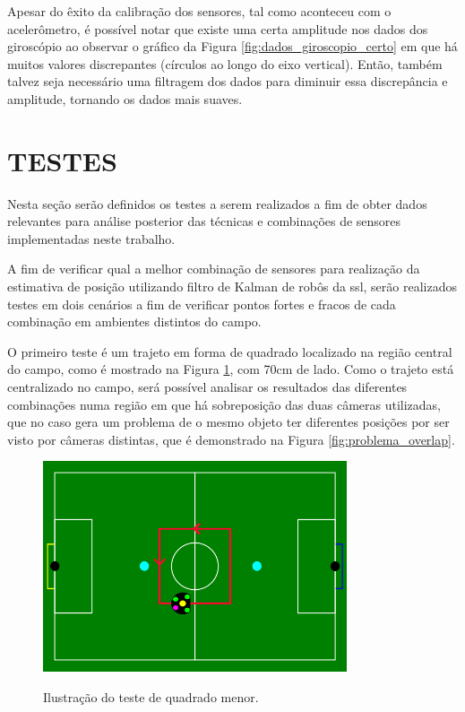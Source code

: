 \documentclass[acronym, symbols, table]{fei}
\begin{document}
	Apesar do êxito da calibração dos sensores, tal como aconteceu com o acelerômetro, é possível notar que existe uma certa amplitude nos dados dos giroscópio ao observar o gráfico da Figura \ref{fig:dados_giroscopio_certo} em que há muitos valores discrepantes (círculos ao longo do eixo vertical). Então, também talvez seja necessário uma filtragem dos dados para diminuir essa discrepância e amplitude, tornando os dados mais suaves.
	
	\section{TESTES}\label{sec:metodologia_testes}
	
		Nesta seção serão definidos os testes a serem realizados a fim de obter dados relevantes para análise posterior das técnicas e combinações de sensores implementadas neste trabalho.
		
		A fim de verificar qual a melhor combinação de sensores para realização da estimativa de posição utilizando filtro de Kalman de robôs da \acrshort{ssl}, serão realizados testes em dois cenários a fim de verificar pontos fortes e fracos de cada combinação em ambientes distintos do campo.
		
		O primeiro teste é um trajeto em forma de quadrado localizado na região central do campo, como é mostrado na Figura \ref{fig:representacao_teste_quadrado_menor}, com 70cm de lado. Como o trajeto está centralizado no campo, será possível analisar os resultados das diferentes combinações numa região em que há sobreposição das duas câmeras utilizadas, que no caso gera um problema de o mesmo objeto ter diferentes posições por ser visto por câmeras distintas, que é demonstrado na Figura \ref{fig:problema_overlap}.
		
		\begin{figure}[!htb]
			\centering
			\caption{Ilustração do teste de quadrado menor.}
			\includegraphics[width=0.80\textwidth]{representacao_teste_quadrado_menor.png}
			\label{fig:representacao_teste_quadrado_menor}
		\end{figure}
	
\end{document}
